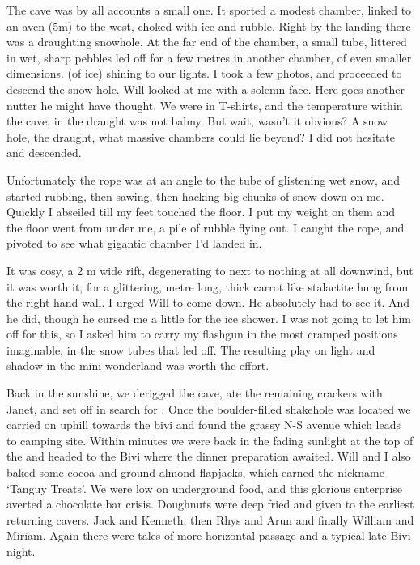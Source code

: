 The cave was by all accounts a small one. It sported a modest chamber, linked to an aven (5m) to the west, choked with ice and rubble. Right by the landing there was a draughting snowhole. At the far end of the chamber, a small tube, littered in wet, sharp pebbles led off for  a few metres in another chamber, of even smaller dimensions.  (of ice) shining to our lights. I took a few photos, and proceeded to descend the snow hole. Will looked at me with a solemn face. Here goes another nutter he might have thought. We were in T-shirts, and the temperature within the cave, in the draught was not balmy. But wait, wasn’t it obvious? A snow hole, the draught, what massive chambers could lie beyond? I did not hesitate and descended.

Unfortunately the rope was at an angle to the tube of glistening wet snow, and started rubbing, then sawing, then hacking big chunks of snow down on me. Quickly I abseiled till my feet touched the floor. I put my weight on them and the floor went from under me, a pile of rubble flying out. I caught the rope, and pivoted to see what gigantic chamber I’d landed in. 

It was cosy, a 2 m wide rift, degenerating to next to nothing at all downwind, but it was worth it, for a glittering, metre long, thick carrot like stalactite hung from the right hand wall. I urged Will to come down. He absolutely had to see it. And he did, though he cursed me a little for the ice shower. I was not going to let him off for this, so I asked him to carry my flashgun in the most cramped positions imaginable, in the snow tubes that led off. The resulting play on light and shadow in the mini-wonderland was worth the effort. 



Back in the sunshine, we derigged the cave, ate the remaining crackers with Janet, and set off in search for . Once the boulder-filled shakehole was located we carried on uphill towards the bivi and found the grassy N-S avenue which leads to camping site. Within minutes we were back in the fading sunlight at the top of the  and headed to the Bivi where the dinner preparation awaited. Will and I also baked some cocoa and ground almond flapjacks, which earned the nickname ‘Tanguy Treats’. We were low on underground food, and this glorious enterprise averted a chocolate bar crisis. Doughnuts were deep fried and given to the earliest returning cavers. Jack and Kenneth, then Rhys and Arun and finally William and Miriam. Again there were tales of more horizontal passage and a typical late Bivi night. 



